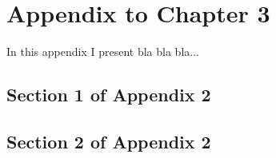 \chapter{Appendix to Chapter 3}
\label{Appendix_for_Ch_3}

  
In this appendix I present bla bla bla...



\section{Section 1 of Appendix 2}
\label{App_2-1}




\newpage
\section{Section 2 of Appendix 2}
\label{App_2-2} 



